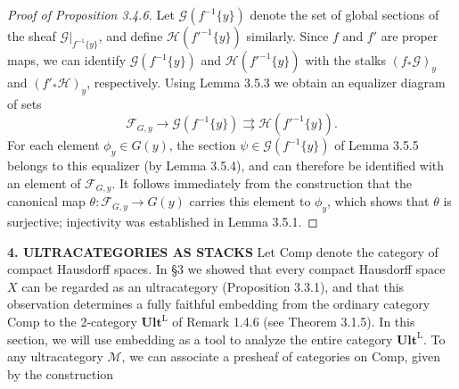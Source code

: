 \documentclass[11pt]{article}
\theoremstyle{plain}
\theoremstyle{definition}
\begin{document}

\begin{proof}[Proof of Proposition 3.4.6]
Let $\mathscr{G}(f^{-1}\{y\})$ denote the set of global sections of the sheaf $\mathscr{G}|_{f^{-1}\{y\}}$, and define $\mathscr{H}(f'^{-1}\{y\})$ similarly. Since $f$ and $f'$ are proper maps, we can identify $\mathscr{G}(f^{-1}\{y\})$ and $\mathscr{H}(f'^{-1}\{y\})$ with the stalks $(f_*\mathscr{G})_y$ and $(f'_*\mathscr{H})_y$, respectively. Using Lemma 3.5.3 we obtain an equalizer diagram of sets
\[
\mathscr{F}_{G,y} \to \mathscr{G}(f^{-1}\{y\}) \rightrightarrows \mathscr{H}(f'^{-1}\{y\}).
\]
For each element $\phi_y \in G(y)$, the section $\psi \in \mathscr{G}(f^{-1}\{y\})$ of Lemma 3.5.5 belongs to this equalizer (by Lemma 3.5.4), and can therefore be identified with an element of $\mathscr{F}_{G,y}$. It follows immediately from the construction that the canonical map $\theta : \mathscr{F}_{G,y} \to G(y)$ carries this element to $\phi_y$, which shows that $\theta$ is surjective; injectivity was established in Lemma 3.5.1.
\end{proof}

\smallskip

\noindent\textbf{4. ULTRACATEGORIES AS STACKS}
Let $\mathrm{Comp}$ denote the category of compact Hausdorff spaces. In §3 we showed that every compact Hausdorff space $X$ can be regarded as an ultracategory (Proposition 3.3.1), and that this observation determines a fully faithful embedding from the ordinary category $\mathrm{Comp}$ to the 2-category $\mathbf{Ult}^{\mathrm{L}}$ of Remark 1.4.6 (see Theorem 3.1.5). In this section, we will use embedding as a tool to analyze the entire category $\mathbf{Ult}^{\mathrm{L}}$. To any ultracategory $\mathcal{M}$, we can associate a presheaf of categories on $\mathrm{Comp}$, given by the construction
\end{document}
